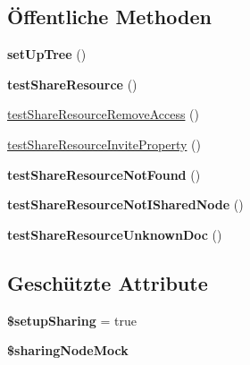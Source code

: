 \subsection*{Öffentliche Methoden}
\begin{DoxyCompactItemize}
\item 
\mbox{\label{class_sabre_1_1_d_a_v_1_1_sharing_1_1_share_resource_test_a77adac470d53f5bbe010e4cb4bf95746}} 
{\bfseries set\+Up\+Tree} ()
\item 
\mbox{\label{class_sabre_1_1_d_a_v_1_1_sharing_1_1_share_resource_test_acaaa3c39f25f2112342b6f1e2dd6b284}} 
{\bfseries test\+Share\+Resource} ()
\item 
\mbox{\hyperlink{class_sabre_1_1_d_a_v_1_1_sharing_1_1_share_resource_test_a5884e80983f1905b137a7ab61ae3a73a}{test\+Share\+Resource\+Remove\+Access}} ()
\item 
\mbox{\hyperlink{class_sabre_1_1_d_a_v_1_1_sharing_1_1_share_resource_test_acf04196d19dea5ff15acf7db84af3b58}{test\+Share\+Resource\+Invite\+Property}} ()
\item 
\mbox{\label{class_sabre_1_1_d_a_v_1_1_sharing_1_1_share_resource_test_af79f8fc81662cfe58f7e5e984fd9debe}} 
{\bfseries test\+Share\+Resource\+Not\+Found} ()
\item 
\mbox{\label{class_sabre_1_1_d_a_v_1_1_sharing_1_1_share_resource_test_a668aff7135ecaf13447473a2d0d6995c}} 
{\bfseries test\+Share\+Resource\+Not\+I\+Shared\+Node} ()
\item 
\mbox{\label{class_sabre_1_1_d_a_v_1_1_sharing_1_1_share_resource_test_ac6178b977fdb822c89769dad190fa72d}} 
{\bfseries test\+Share\+Resource\+Unknown\+Doc} ()
\end{DoxyCompactItemize}
\subsection*{Geschützte Attribute}
\begin{DoxyCompactItemize}
\item 
\mbox{\label{class_sabre_1_1_d_a_v_1_1_sharing_1_1_share_resource_test_a53f3d5f35aeb913ac1a4b060b961c9e4}} 
{\bfseries \$setup\+Sharing} = true
\item 
\mbox{\label{class_sabre_1_1_d_a_v_1_1_sharing_1_1_share_resource_test_ab7fa3869ec385d2b95c56a9859f11ff7}} 
{\bfseries \$sharing\+Node\+Mock}
\end{DoxyCompactItemize}


